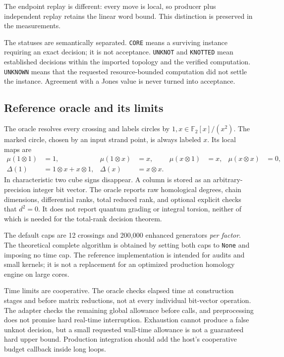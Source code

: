 \documentclass[11pt,letterpaper]{article}
\theoremstyle{definition}
\newcommand{\F}{\mathbb F_2}
\newcommand{\status}[1]{\textnormal{\texttt{#1}}}
\begin{document}
The endpoint replay is different: every move is local, so producer plus independent replay retains the linear word bound. This distinction is preserved in the measurements.

The statuses are semantically separated. \status{CORE} means a surviving instance requiring an exact decision; it is not acceptance. \status{UNKNOT} and \status{KNOTTED} mean established decisions within the imported topology and the verified computation. \status{UNKNOWN} means that the requested resource-bounded computation did not settle the instance. Agreement with a Jones value is never turned into acceptance.

\subsection{Reference oracle and its limits}
The oracle resolves every crossing and labels circles by $1,x\in\F[x]/(x^2)$. The marked circle, chosen by an input strand point, is always labeled $x$. Its local maps are
\begin{align*}
 \mu(1\otimes1)&=1,&\mu(1\otimes x)&=x,&
 \mu(x\otimes1)&=x,&\mu(x\otimes x)&=0,\\
 \Delta(1)&=1\otimes x+x\otimes1,&
 \Delta(x)&=x\otimes x.
\end{align*}
In characteristic two cube signs disappear. A column is stored as an arbitrary-precision integer bit vector. The oracle reports raw homological degrees, chain dimensions, differential ranks, total reduced rank, and optional explicit checks that $d^2=0$. It does not report quantum grading or integral torsion, neither of which is needed for the total-rank decision theorem.

The default caps are 12 crossings and 200,000 enhanced generators \emph{per factor}. The theoretical complete algorithm is obtained by setting both caps to \texttt{None} and imposing no time cap. The reference implementation is intended for audits and small kernels; it is not a replacement for an optimized production homology engine on large cores.

Time limits are cooperative. The oracle checks elapsed time at construction stages and before matrix reductions, not at every individual bit-vector operation. The adapter checks the remaining global allowance before calls, and preprocessing does not promise hard real-time interruption. Exhaustion cannot produce a false unknot decision, but a small requested wall-time allowance is not a guaranteed hard upper bound. Production integration should add the host's cooperative budget callback inside long loops.
\end{document}
